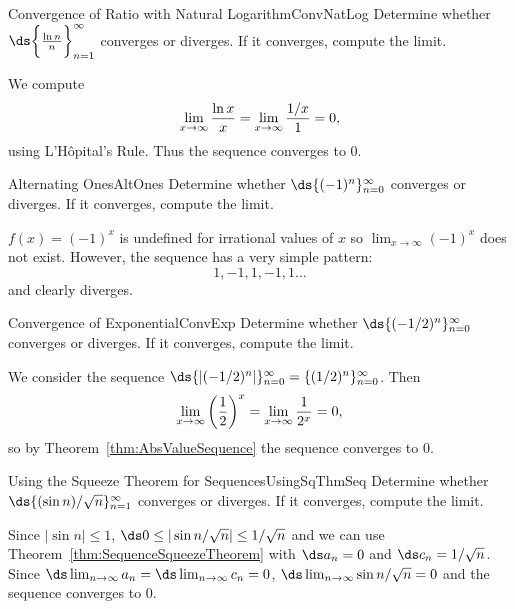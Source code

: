 \begin{example}{Convergence of Ratio with Natural Logarithm}{ConvNatLog}
Determine whether $\ds\bigg\{{\ln n\over n}\bigg\}_{n=1}^\infty$ converges or
diverges. If it converges, compute the limit.
\end{example}
\begin{solution}
We compute
$$\lim_{x\to\infty}{\ln x\over x}=\lim_{x\to\infty}{1/x\over 1}=
0,$$
using L'H\^opital's Rule. Thus the sequence converges to 0.
\end{solution}

\begin{example}{Alternating Ones}{AltOnes}
Determine whether $\ds\{(-1)^n\}_{n=0}^\infty$ converges or
diverges. If it converges, compute the limit.
\end{example}
\begin{solution}
$f(x)=(-1)^x$ is undefined for irrational values of $x$ so $\lim_{x\to\infty}(-1)^x$ does not exist. However, the sequence has a very simple pattern:
$$1,-1,1,-1,1\ldots$$
and clearly diverges.
\end{solution}

\begin{example}{Convergence of Exponential}{ConvExp}
Determine whether $\ds\{(-1/2)^n\}_{n=0}^\infty$ converges or
diverges. If it converges, compute the limit.
\end{example}
\begin{solution}
We consider the sequence 
$\ds\{|(-1/2)^n|\}_{n=0}^\infty=\{(1/2)^n\}_{n=0}^\infty$.
Then
$$
  \lim_{x\to\infty}\left({1\over2}\right)^x=\lim_{x\to\infty}{1\over2^x}=0,
$$
so by Theorem~\ref{thm:AbsValueSequence} the sequence converges to 0.
\end{solution}

\begin{example}{Using the Squeeze Theorem for Sequences}{UsingSqThmSeq}
Determine whether $\ds\{(\sin n)/\sqrt{n}\}_{n=1}^\infty$ converges or
diverges. If it converges, compute the limit.
\end{example}
\begin{solution}
Since $|\sin n|\le 1$, $\ds 0\le|\sin n/\sqrt{n}|\le
1/\sqrt{n}$ and we can use Theorem~\ref{thm:SequenceSqueezeTheorem}
with $\ds a_n=0$ and $\ds c_n=1/\sqrt{n}$. Since
$\ds\lim_{n\to\infty} a_n=\ds\lim_{n\to\infty} c_n=0$, 
$\ds\lim_{n\to\infty}\sin n/\sqrt{n}=0$ and the sequence converges to 0.
\end{solution}

